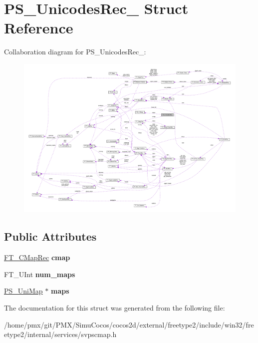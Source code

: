 \hypertarget{structPS__UnicodesRec__}{}\section{P\+S\+\_\+\+Unicodes\+Rec\+\_\+ Struct Reference}
\label{structPS__UnicodesRec__}


Collaboration diagram for P\+S\+\_\+\+Unicodes\+Rec\+\_\+\+:
\nopagebreak
\begin{figure}[H]
\begin{center}
\leavevmode
\includegraphics[width=350pt]{structPS__UnicodesRec____coll__graph}
\end{center}
\end{figure}
\subsection*{Public Attributes}
\begin{DoxyCompactItemize}
\item 
\mbox{\label{structPS__UnicodesRec___a4c3e28cb86c8a7039107437dcf995da7}} 
\hyperlink{structFT__CMapRec__}{F\+T\+\_\+\+C\+Map\+Rec} {\bfseries cmap}
\item 
\mbox{\label{structPS__UnicodesRec___abbc3617f13363ddcf851ee229752b08d}} 
F\+T\+\_\+\+U\+Int {\bfseries num\+\_\+maps}
\item 
\mbox{\label{structPS__UnicodesRec___a86d4897892e4b3c69ae749ae0736c84e}} 
\hyperlink{structPS__UniMap__}{P\+S\+\_\+\+Uni\+Map} $\ast$ {\bfseries maps}
\end{DoxyCompactItemize}


The documentation for this struct was generated from the following file\+:\begin{DoxyCompactItemize}
\item 
/home/pmx/git/\+P\+M\+X/\+Simu\+Cocos/cocos2d/external/freetype2/include/win32/freetype2/internal/services/svpscmap.\+h\end{DoxyCompactItemize}
